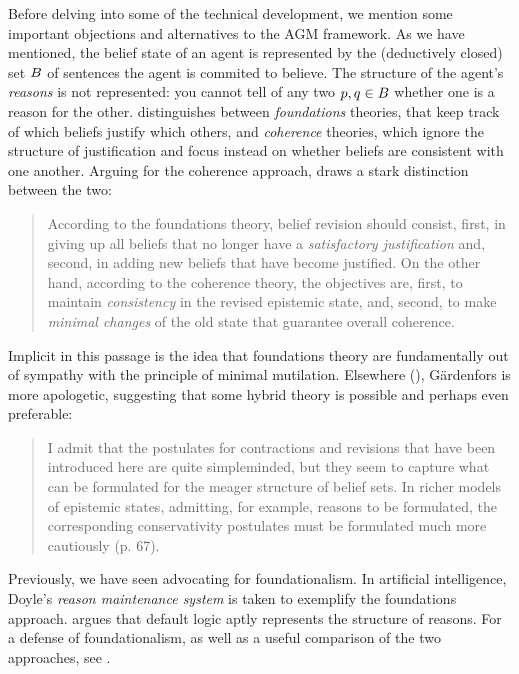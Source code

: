 Before delving into some of the technical development, we mention some important
objections and alternatives to the AGM framework. As we have mentioned, the
belief state of an agent is represented by the (deductively closed) set $B$
of sentences the agent is commited to believe. The structure of the agent's {\em
reasons} is not represented: you cannot tell of any two $p,q\in B$ whether
one is a reason for the other. \citet{gardenfors1992beliefrevision}
distinguishes between {\em foundations} theories, that keep track of which
beliefs justify which others, and {\em coherence} theories, which ignore the
structure of justification and focus instead on whether beliefs are consistent
with one another. Arguing for the coherence approach,
\citet{gardenfors1992beliefrevision} draws a stark distinction between the two:
\begin{quote}
According to the foundations theory, belief revision should consist, first, in
giving up all beliefs that no longer have a {\em satisfactory justification}
and, second, in adding new beliefs that have become justified. On the other
hand, according to the coherence theory, the objectives are, first, to maintain
{\em consistency} in the revised epistemic state, and, second, to make {\em
minimal changes} of the old state that guarantee overall coherence. 
\end{quote}
Implicit in this passage is the idea that foundations theory are fundamentally
out of sympathy with the principle of minimal mutilation. Elsewhere
(), G\"{a}rdenfors is more apologetic,
suggesting that some hybrid theory is possible and perhaps even preferable:
\begin{quote}
  I admit that the postulates for contractions and revisions that have been
  introduced here are quite simpleminded, but they seem to capture what can be
  formulated for the meager structure of belief sets. In richer models of
  epistemic states, admitting, for example, reasons to be formulated, the
  corresponding conservativity postulates must be formulated much more
  cautiously (p. 67).
\end{quote}
Previously, we have seen \citet{pollock1987defeasible} advocating for
foundationalism. In artificial intelligence, Doyle's 
{\em reason maintenance system} is taken to exemplify the foundations approach.
\citet{horty2012reasons} argues that default logic aptly represents the
structure of reasons. For a defense of foundationalism, as well as a useful
comparison of the two approaches, see \citet{doyle1992reason}.

